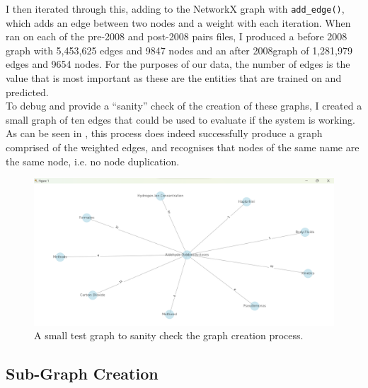 \documentclass{l4proj}
\begin{document}
I then iterated through this, adding to the NetworkX graph with \texttt{add\_edge()},  which adds an edge between two nodes and a weight with each iteration. When ran on each of the pre-2008 and post-2008 pairs files, I produced a before 2008 graph with 5,453,625 edges and 9847 nodes and an after  2008graph of 1,281,979 edges and 9654 nodes. For the purposes of our data, the number of edges is the value that is most important as these are the entities that are trained on and predicted. \\

To debug and provide a ``sanity'' check of the creation of these graphs, I created a small graph of ten edges that could be used to evaluate if the system is working. As can be seen in , this process does indeed successfully produce a graph comprised of the weighted edges, and recognises that nodes of the same name are the same node, i.e. no node duplication. \\

\begin{figure}[h]
    \centering
    \includegraphics[width=\linewidth]{images/test_graph_creation.png}
    \caption{A small test graph to sanity check the graph creation process.}
    \label{fig:test_graph_creation}
\end{figure}

\subsection{Sub-Graph Creation} 
\end{document}
